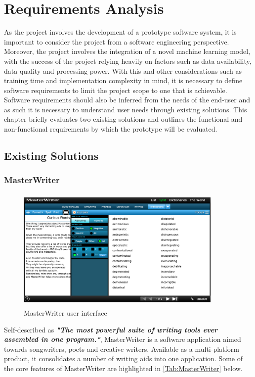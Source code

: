 \chapter{Requirements Analysis}
\label{chap:requirements_analysis}
As the project involves the development of a prototype software system, it is important to consider the project from a software engineering perspective. Moreover, the project involves the integration of a novel machine learning model, with the success of the project relying heavily on factors such as data availability, data quality and processing power. With this and other considerations such as training time and implementation complexity in mind, it is necessary to define software requirements to limit the project scope to one that is achievable. Software requirements should also be inferred from the needs of the end-user and as such it is necessary to understand user needs through existing solutions. This chapter briefly evaluates two existing solutions and outlines the functional and non-functional requirements by which the prototype will be evaluated.
\section{Existing Solutions}
\subsection{MasterWriter}
\begin{figure}[h]
	\includegraphics[width=10cm, height=6cm]{./figures/fig9}
	\centering
	\caption[MasterWriter User Interface]{MasterWriter user interface}
	\label{fig:fig9}
\end{figure}
\noindent
Self-described as \textbf{\textit{"The most powerful suite of writing tools ever assembled in one program."}}, MasterWriter is a software application aimed towards songwriters, poets and creative
writers. Available as a multi-platform product, it consolidates a number of writing aids into one application. Some of the core features of MasterWriter are highlighted in \autoref{Tab:MasterWriter} below.

